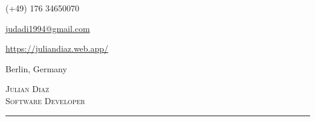 \documentclass[a4paper, 10pt]{article}
\begin{document}
\begin{flushright}
  \item {\Calluna (+49) 176 34650070}  %
  \item {\Calluna \href{mailto:judadi1994@gmail.com}{judadi1994@gmail.com}}   %
  \item {\Calluna \href{hhttps://juliandiaz.web.app/}{https://juliandiaz.web.app/}}  %
    \item {\Calluna Berlin, Germany}  %
\end{flushright}\vspace{-54pt}

\begin{flushleft}
  {\Calluna \fontsize{30pt}{30pt}\selectfont \textsc{Julian Diaz}} 
  \\
  {\Calluna \fontsize{14pt}{14pt}\selectfont \textsc{Software Developer}}
  \noindent\rule{\textwidth}{0.4pt}
\end{flushleft}
\end{document}
